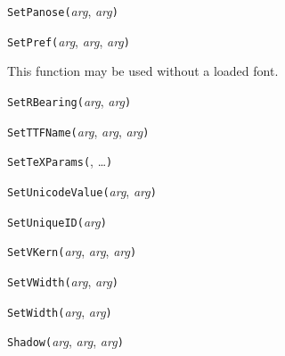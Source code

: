 \texttt{SetPanose(}\textit{arg}, \textit{arg}\texttt{)}



\texttt{SetPref(}\textit{arg}, \textit{arg}, \textit{arg}\texttt{)}

This function may be used without a loaded font.



\texttt{SetRBearing(}\textit{arg}, \textit{arg}\texttt{)}



\texttt{SetTTFName(}\textit{arg}, \textit{arg}, \textit{arg}\texttt{)}



\texttt{SetTeXParams(}, \ldots\texttt{)}



\texttt{SetUnicodeValue(}\textit{arg}, \textit{arg}\texttt{)}



\texttt{SetUniqueID(}\textit{arg}\texttt{)}



\texttt{SetVKern(}\textit{arg}, \textit{arg}, \textit{arg}\texttt{)}



\texttt{SetVWidth(}\textit{arg}, \textit{arg}\texttt{)}



\texttt{SetWidth(}\textit{arg}, \textit{arg}\texttt{)}



\texttt{Shadow(}\textit{arg}, \textit{arg}, \textit{arg}\texttt{)}

